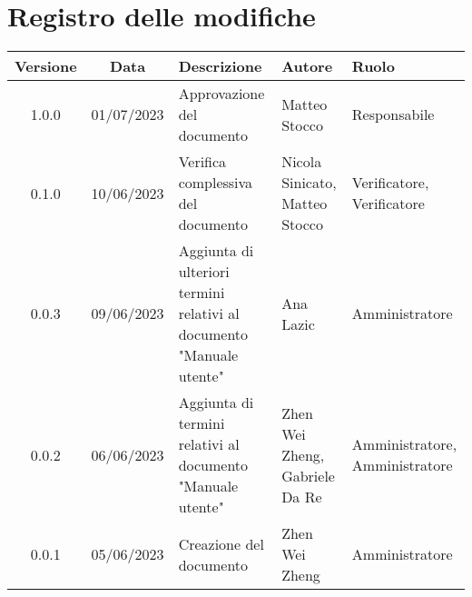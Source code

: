 \section*{Registro delle modifiche}
\begin{center}
\setlength\extrarowheight{5pt}
\renewcommand\tabularxcolumn[1]{>{\Centering}m{#1}}
\begin{tabularx}{\textwidth}{| c | c | X | X | X |} 
\hline
\rowcolor{white}
\textbf{Versione} & \textbf{Data} & \textbf{Descrizione} & \textbf{Autore} & \textbf{Ruolo}\\
\hline
 1.0.0 & 01/07/2023 & Approvazione del documento & Matteo Stocco & Responsabile\\
 \hline
 0.1.0 & 10/06/2023 & Verifica complessiva del documento & Nicola Sinicato, Matteo Stocco & Verificatore, Verificatore \\
 \hline
 0.0.3 & 09/06/2023 & Aggiunta di ulteriori termini relativi al documento "Manuale utente" & Ana Lazic & Amministratore\\
 \hline
 0.0.2 & 06/06/2023 & Aggiunta di termini relativi al documento "Manuale utente" & Zhen Wei Zheng, Gabriele Da Re & Amministratore, Amministratore\\
 \hline
 0.0.1 & 05/06/2023 & Creazione del documento & Zhen Wei Zheng & Amministratore\\
 \hline
\end{tabularx}
\end{center}

